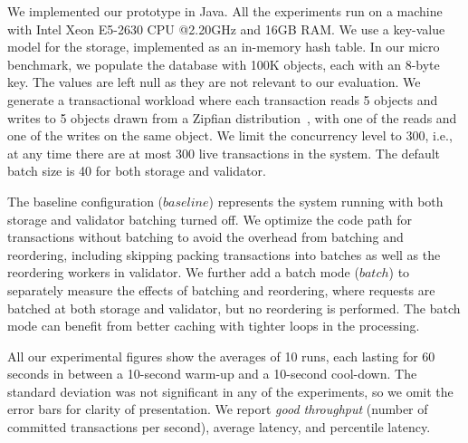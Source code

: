 We implemented our prototype in Java. All the experiments run on a machine with
Intel Xeon E5-2630 CPU @2.20GHz and 16GB RAM. We use a key-value model for the
storage, implemented as an in-memory hash table. In our micro benchmark, we populate the database with 100K objects, each with an 8-byte key. The values are left null as they are not relevant to our evaluation. We generate a transactional workload where each transaction reads 5 objects and writes to 5 objects drawn from a Zipfian distribution~\cite{gray1994quickly}, with one of the reads and one of the writes on the same object. We limit the concurrency level to 300, i.e., at any time there are at most 300 live transactions in the system. The default batch size is 40 for both storage and validator.

The baseline configuration ($baseline$) represents the system running with both storage and validator batching turned off. We optimize the code path for transactions without batching to avoid the overhead from batching and reordering, including skipping packing transactions into batches as well as the reordering workers in validator. We further add a batch mode ($batch$) to separately measure the effects of batching and reordering, where requests are batched at both storage and validator, but no reordering is performed. The batch mode can benefit from better caching with tighter loops in the processing. 



All our experimental figures show the averages of 10 runs, each lasting for 60 seconds in between a 10-second warm-up and a 10-second cool-down. The standard deviation was not significant in any of the experiments, so we omit the error bars for clarity of presentation. We report \emph{good throughput} (number of committed transactions per second), average latency, and percentile latency.


